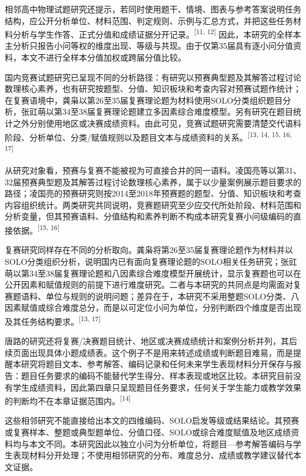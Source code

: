 \documentclass[
  12pt,
  a4paper]{ctexbook}
\begin{document}
相邻高中物理试题研究还提示，若同时使用题干、情境、图表与参考答案说明任务结构，应公开分析单位、材料范围、判定规则、示例与汇总方式，并把这些任务材料分析与学生作答、正式分值和成绩证据分开记录。\textsuperscript{[11, 12]}
因此，本研究的全样本主分析只报告小问等权的维度出现、等级与共现。由于仅第35届具有逐小问分值资料，本文不进行全样本分值加权或跨届分值比较。

国内竞赛试题研究已呈现不同的分析路径：有研究以预赛典型题及其解答过程讨论数理核心素养，也有研究按题型、分值、知识板块和考查内容对预赛试题作统计；在复赛语境中，龚枭以第26至35届复赛理论题为材料使用SOLO分类组织题目分析，张豇萌以第34至38届复赛理论题建立多因素综合难度模型。另有研究在题目统计之外分别使用地区或决赛成绩资料。由此可见，竞赛试题研究需要清楚交代语料阶段、分析单位、分类/赋值规则以及题目文本与成绩资料的关系。\textsuperscript{[13, 14, 15, 16, 17]}

从研究对象看，预赛与复赛不能被视为可直接合并的同一语料。凌国亮等以第31、32届预赛典型题及其解答过程讨论数理核心素养，属于以少量案例展示题目要求的路径；凌国亮的预赛研究则按2014至2018年预赛题的题型、分值、知识板块和考查内容组织统计。两类研究共同说明，竞赛题研究至少应交代所处阶段、材料范围和分析变量，但其预赛语料、分值结构和素养判断不构成本研究复赛小问级编码的直接依据。\textsuperscript{[15, 16]}

复赛研究同样存在不同的分析取向。龚枭将第26至35届复赛理论题作为材料并以SOLO分类组织分析，说明国内已有面向复赛理论题的SOLO相关任务研究；张豇萌以第34至38届复赛理论题和八因素综合难度模型开展统计，显示复赛题也可以在公开因素和赋值规则的前提下进行难度研究。二者与本研究的共同点是均需面对复赛题语料、单位与规则的说明问题；差异在于，本研究不采用整题SOLO分类、八因素赋值或综合难度总分，而是以可定位小问为单位，分别判断四个维度是否出现及其任务结构要求。\textsuperscript{[13, 17]}

唐路的研究还将复赛/决赛题目统计、地区或决赛成绩统计和案例分析并列，其后续页面出现具体小题成绩表。这个例子不是用来转述成绩或判断题目难易，而是提醒本研究将题目文本、参考解答、编码记录和任何未来学生表现材料分开保存与报告：题目任务要求的编码不能替代学生得分、样本表现或地区比较。本研究目前没有学生成绩资料，因此第四章只呈现题目任务要求，任何关于学生能力或教学效果的判断均不在本章证据范围内。\textsuperscript{[14]}

这些相邻研究不能直接给出本文的四维编码、SOLO启发等级或结果结论。其预赛或复赛样本、整题或典型题单位、分值口径、SOLO或综合难度赋值及地区成绩资料均与本文不同。本研究因此以独立小问为分析单位，将题目---参考解答编码与学生表现材料分开处理；不使用相邻研究的分布、难度总分、成绩或教学建议替代本文证据。
\end{document}
